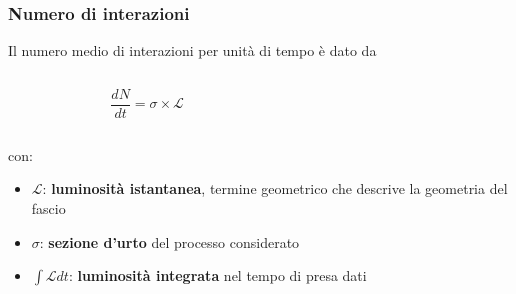 \documentclass{beamer}
\begin{document}

\begin{frame}[t]
\frametitle{Numero di interazioni}


Il numero medio di interazioni per unit\`a di tempo \`e dato da\\
\medskip

\begin{columns}
\begin{column}{0.4\textwidth}
$$
\frac{dN}{dt} =\sigma \times \mathcal{L}
$$
\end{column}
\begin{column}{0.6\textwidth}
\end{column}
\end{columns}
\medskip
con:\\
\begin{itemize}
\item $\mathcal{L}$: \textbf{luminosit\`a istantanea}, termine geometrico che descrive la geometria del fascio 
\item $\sigma$: \textbf{sezione d'urto} del processo considerato
\item $\int\mathcal{L}dt$: \textbf{luminosit\`a integrata} nel tempo di presa dati
\end{itemize}
\bigskip 

\end{frame}

\end{document}
